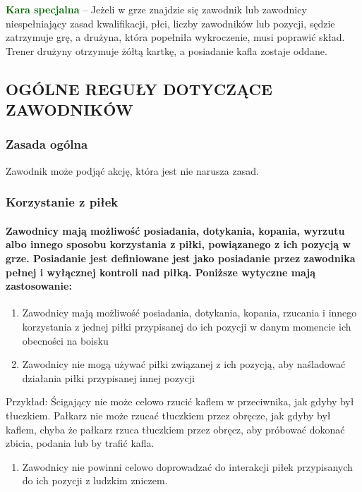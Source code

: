 \documentclass[12pt]{article}
\newcommand\other[1]{\bgroup\textcolor{darkgreen}{\textbf{#1}}}
\begin{document}
\other{Kara specjalna} -- Jeżeli w grze znajdzie się zawodnik lub
zawodnicy niespełniający zasad kwalifikacji, płci, liczby zawodników lub
pozycji, sędzie zatrzymuje grę, a drużyna, która popełniła wykroczenie,
musi poprawić skład. Trener drużyny otrzymuje żółtą kartkę, a posiadanie
kafla zostaje oddane.

\subsection{OGÓLNE REGUŁY DOTYCZĄCE ZAWODNIKÓW}

\subsubsection{Zasada ogólna}

Zawodnik może podjąć akcję, która jest nie narusza zasad.

\subsubsection{Korzystanie z piłek}

\paragraph{Zawodnicy mają możliwość posiadania, dotykania,
	kopania, wyrzutu albo innego sposobu korzystania z piłki, powiązanego z
	ich pozycją w grze. Posiadanie jest definiowane jest jako posiadanie
	przez zawodnika pełnej i wyłącznej kontroli nad piłką. Poniższe wytyczne
	mają zastosowanie:}

\begin{enumerate}
	\item
	      Zawodnicy mają możliwość posiadania, dotykania, kopania, rzucania i
	      innego korzystania z jednej piłki przypisanej do ich pozycji w danym
	      momencie ich obecności na boisku
	\item
	      Zawodnicy nie mogą używać piłki związanej z ich pozycją, aby
	      naśladować działania piłki przypisanej innej pozycji
\end{enumerate}

Przykład: Ścigający nie może celowo rzucić kaflem w
przeciwnika, jak gdyby był tłuczkiem. Pałkarz nie może rzucać tłuczkiem
przez obręcze, jak gdyby był kaflem, chyba że pałkarz rzuca tłuczkiem
przez obręcz, aby próbować dokonać zbicia, podania lub by trafić kafla.

\begin{enumerate}[resume]
	\item Zawodnicy nie powinni celowo doprowadzać do interakcji piłek
	      przypisanych do ich pozycji z ludzkim zniczem.
\end{enumerate}
\end{document}
